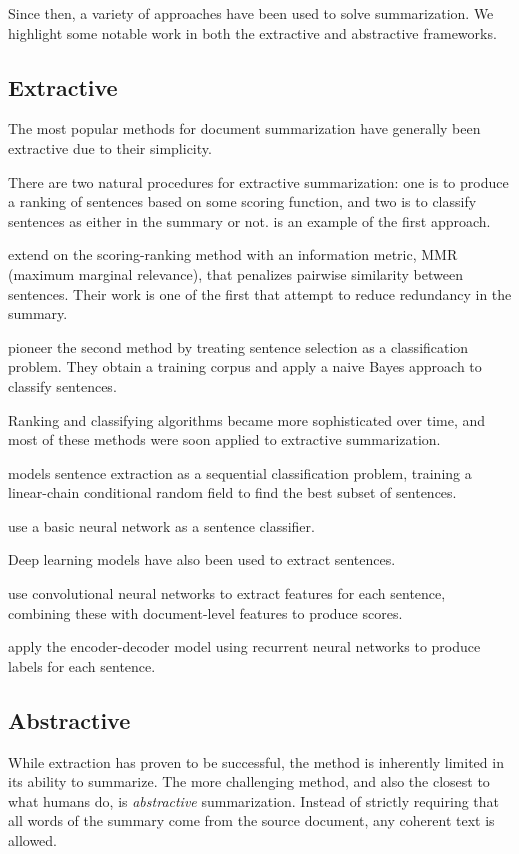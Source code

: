 \documentclass[12pt]{report}
\begin{document}
Since then, a variety of approaches have been used to solve summarization. We highlight some notable work in both the extractive and abstractive frameworks.

\subsection{Extractive} The most popular methods for document summarization have generally been extractive due to their simplicity.

There are two natural procedures for extractive summarization: one is to produce a ranking of sentences based on some scoring function, and two is to classify sentences as either in the summary or not. \citet{luhn1958automatic} is an example of the first approach.

\citet{Carbonell1998} extend on the scoring-ranking method with an information metric, MMR (maximum marginal relevance), that penalizes pairwise similarity between sentences. Their work is one of the first that attempt to reduce redundancy in the summary.

\citet{Kupiec1995} pioneer the second method by treating sentence selection as a classification problem. They obtain a training corpus and apply a naive Bayes approach to classify sentences.

Ranking and classifying algorithms became more sophisticated over time, and most of these methods were soon applied to extractive summarization.

\citet{Shen2004} models sentence extraction as a sequential classification problem, training a linear-chain conditional random field to find the best subset of sentences.

 
\citet{svore2007} use a basic neural network as a sentence classifier.


Deep learning models have also been used to extract sentences.

\citet{Cao2015} use convolutional neural networks to extract features for each sentence, combining these with document-level features to produce scores.

\citet{Cheng2016} apply the encoder-decoder model using recurrent neural networks to produce labels for each sentence.



\subsection{Abstractive} While extraction has proven to be successful, the method is inherently limited in its ability to summarize. The more challenging method, and also the closest to what humans do, is \emph{abstractive} summarization. Instead of strictly requiring that all words of the summary come from the source document, any coherent text is allowed.
\end{document}
